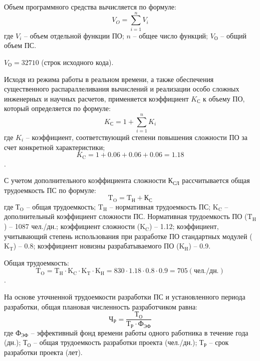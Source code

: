 Объем программного средства вычисляется по формуле:
\begin{equation}
\label{formula:economics:cost:f_vo}
V_{O} = \sum_{i=1}^n V_{i}
\end{equation}
где $V_{i}$ -- объем отдельной функции ПО; $n$ -- общее число функций; $V_{\text{О}}$ -- общий объем ПС.

$V_{\text{О}} = 32710$ (строк исходного кода).

Исходя из режима работы в реальном времени, а также обеспечения существенного распараллеливания вычислений и реализации особо сложных инженерных и научных расчетов, применяется коэффициент $K_{\text{С}}$ к объему ПО, который определяется по формуле:
\begin{equation}
\label{formula:economics:cost:f_kc}
K_{\text{С}} = 1 + \sum_{i=1}^n K_{i}
\end{equation}
где $K_{i}$ -- коэффициент, соответствующий степени повышения сложности ПО за счет конкретной характеристики;
$$K_{\text{C}} = 1 + 0.06 + 0.06 + 0.06 = 1.18$$.

С учетом дополнительного коэффициента сложности ${\text{К}}_{\text{СЛ}}$ рассчитывается общая трудоемкость ПС по формуле:
\begin{equation}
\label{formula:economics:cost:f_kcl}
{\text{T}}_{\text{O}} = {\text{T}}_{\text{Н}} + {\text{К}}_{\text{С}}
\end{equation}
где ${\text{Т}}_{\text{O}}$ -- общая трудоемкость; ${\text{T}}_{\text{H}}$ -- нормативная трудоемкость ПС; ${\text{K}}_{\text{C}}$ -- дополнительный коэффициент сложности ПС. Нормативная трудоемкость ПО (${\text{T}}_{\text{H}}$) -- 1087 чел./дн.; коэффициент сложности (${\text{K}}_{\text{C}}$) -- 1.12; коэффициент, учитывающий степень использования при разработке ПО стандартных модулей (${\text{K}}_{\text{T}}$) -- 0.8; коэффициент новизны разрабатываемого ПО (${\text{K}}_{\text{H}}$) -- 0.9.

Общая трудоемкость:
$${\text{T}}_{\text{O}} = {\text{T}}_{\text{H}} \cdot {\text{K}}_{\text{C}} \cdot {\text{K}}_{\text{T}} \cdot {\text{K}}_{\text{H}} = 830 \cdot 1.18 \cdot 0.8 \cdot 0.9 = 705 (\text{чел./дн.})$$.

На основе уточненной трудоемкости разработки ПС и установленного периода разработки, общая плановая численность разработчиком равна:
\begin{equation}
\label{formula:economics:cost:f_chr}
{\text{Ч}}_{\text{Р}} = \frac{ {\text{Т}}_{\text{О}} }{ {\text{Т}}_{\text{Р}} \cdot {\text{Ф}}_{\text{ЭФ}} }
\end{equation}
где ${\text{Ф}}_{\text{ЭФ}}$ -- эффективный фонд времени работы одного работника в течение года (дн.); ${\text{Т}}_{\text{О}}$ -- общая трудоемкость разработки проекта (чел./дн.); ${\text{Т}}_{\text{Р}}$ -- срок разработки проекта (лет).

